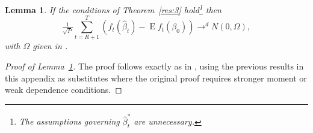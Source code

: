 \documentclass[11pt,fleqn]{article}
\newtheorem{lema}{Lemma}[section]
\theoremstyle{definition}
\DeclareMathOperator{\E}{E}
\begin{document}
\begin{lema}\label{res:a5}
  If the conditions of Theorem~\ref{res:3} hold\footnote{The
    assumptions governing $\hat{\beta}_t^{*}$ are unnecessary.} then
  \begin{equation}
    \tfrac{1}{\sqrt{P}} \sum_{t=R+1}^T
    (f_{t}(\hat{\beta}_{t}) - \E f_{t}(\beta_{0})) \to^d N(0, \Omega),
  \end{equation}
  with $\Omega$ given in \citet[Theorem 2.3.1]{Mcc:00}.
\end{lema}
\begin{proof}[Proof of Lemma~\ref{res:a5}]
  The proof follows exactly as in \citet[Theorem 2.3.1]{Mcc:00}, using
  the previous results in this appendix as substitutes where the
  original proof requires stronger moment or weak dependence
  conditions.
\end{proof}


\end{document}
